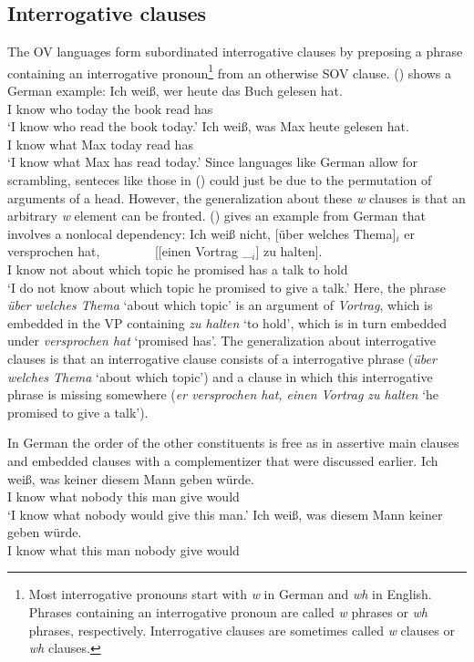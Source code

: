 \subsection{Interrogative clauses}


The OV languages form subordinated interrogative clauses by preposing a phrase containing an
interrogative pronoun\footnote{
Most interrogative pronouns start with \emph{w} in German and \emph{wh} in English. Phrases
containing an interrogative pronoun are called \emph{w} phrases or \emph{wh} phrases,
respectively. Interrogative clauses are sometimes called \emph{w} clauses or \emph{wh} clauses.
} from an
otherwise SOV clause. () shows a German example:
\eal
\ex 
\gll Ich weiß, wer heute das Buch gelesen hat.\\
     I know    who today the book read has\\
\glt `I know who read the book today.'
\ex 
\gll Ich weiß, was Max heute gelesen hat.\\
     I know    what Max today read has\\
\glt `I know what Max has read today.'
\zl
Since languages like German allow for scrambling, senteces like those in () could just be due
to the permutation of arguments of a head. However, the generalization about these \emph{w} clauses
is that an arbitrary \emph{w} element can be fronted. () gives an example from German that
involves a nonlocal dependency:
\ea
\gll Ich weiß nicht, [über welches Thema]$_i$ er versprochen hat,~~~~~~~~ [[einen Vortrag \_$_i$] zu halten].\\
     I know not      \spacebr about which topic he promised has \hspaceThis{[[}a talk to  hold\\
\glt `I do not know about which topic he promised to give a talk.'
\z
Here, the phrase \emph{über welches Thema} `about which topic' is an argument of \emph{Vortrag},
which is embedded in the VP containing \emph{zu halten} `to hold', which is in turn embedded under
\emph{versprochen hat} `promised has'. The generalization about interrogative clauses is that an
interrogative clause consists of a interrogative phrase (\emph{über welches Thema} `about which
topic') and a clause in which this interrogative phrase is missing somewhere (\emph{er versprochen
  hat, einen Vortrag zu halten} `he promised to give a talk').

In German the order of the other constituents is free as in assertive main clauses and embedded
clauses with a complementizer that were discussed earlier. 
\eal
\ex
\gll Ich weiß, was keiner diesem Mann geben würde.\\
     I know    what nobody this man give would\\
\glt `I know what nobody would give this man.'
\ex 
\gll Ich weiß, was diesem Mann keiner geben würde.\\
     I know what this man nobody give would\\
\zl

